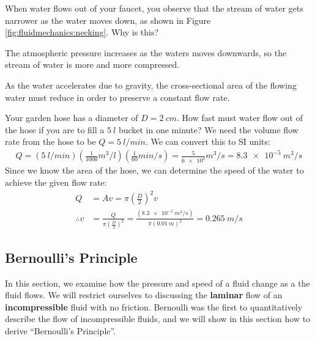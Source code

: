 {{\begin{checkpoint}
\begin{MCquestion}{When water flows out of your faucet, you observe that the stream of water gets narrower as the water moves down, as shown in Figure \ref{fig:fluidmechanics:necking}. Why is this?}
\item The atmospheric pressure increases as the waters moves downwards, so the stream of water is more and more compressed.
\item As the water accelerates due to gravity, the cross-sectional area of the flowing water must reduce in order to preserve a constant flow rate. \correct    
\end{MCquestion}
\end{checkpoint}

\begin{example}{Your garden hose has a diameter of $D=\SI{2}{cm}$. How fast must water flow out of the hose if you are to fill a $\SI{5}{l}$ bucket in one minute?}
We need the volume flow rate from the hose to be $Q=\SI{5}{l/min}$. We can convert this to SI units:
\begin{align*}
Q=(\SI{5}{l/min})\left(\frac{1}{1000}\si{m^3/l}\right) \left(\frac{1}{60}\si{min/s}\right)=\frac{5}{\num{6e4}}\si{m^3/s}=\SI{8.3e-5}{m^3/s}
\end{align*}
Since we know the area of the hose, we can determine the speed of the water to achieve the given flow rate:
\begin{align*}
Q &= Av=\pi \left(\frac{D}{2}\right)^2v \\
\therefore v&=\frac{Q}{\pi \left(\frac{D}{2}\right)^2}=\frac{(\SI{8.3e-5}{m^3/s})}{\pi(\SI{0.01}{m})^2}=\SI{0.265}{m/s}
\end{align*}
\end{example}


\subsection{Bernoulli's Principle}
In this section, we examine how the pressure and speed of a fluid change as a the fluid flows. We will restrict ourselves to discussing the \textbf{laminar} flow of an \textbf{incompressible} fluid with no friction. Bernoulli was the first to quantitatively describe the flow of incompressible fluids, and we will show in this section how to derive ``Bernoulli's Principle''. 

}}
